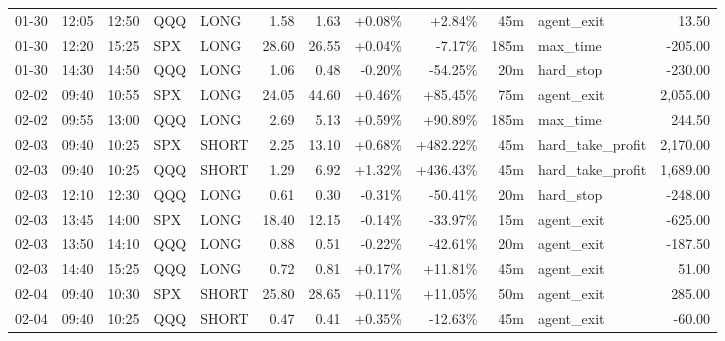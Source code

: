 \documentclass[11pt,a4paper,twoside]{article}
\begin{document}
\begin{center}
\begin{longtable}{>{\color{txtmain}}l l l l l r r r r r >{\color{txtmain}}l r}
01-30 & 12:05 & 12:50 & QQQ & LONG & 1.58 & 1.63 & \textcolor{wingreen}{+0.08\%} & \textcolor{wingreen}{+2.84\%} & 45m & agent\_exit & \textcolor{wingreen}{13.50} \\
01-30 & 12:20 & 15:25 & SPX & LONG & 28.60 & 26.55 & \textcolor{wingreen}{+0.04\%} & \textcolor{lossred}{-7.17\%} & 185m & max\_time & \textcolor{lossred}{-205.00} \\
01-30 & 14:30 & 14:50 & QQQ & LONG & 1.06 & 0.48 & \textcolor{lossred}{-0.20\%} & \textcolor{lossred}{-54.25\%} & 20m & hard\_stop & \textcolor{lossred}{-230.00} \\
02-02 & 09:40 & 10:55 & SPX & LONG & 24.05 & 44.60 & \textcolor{wingreen}{+0.46\%} & \textcolor{wingreen}{+85.45\%} & 75m & agent\_exit & \textcolor{wingreen}{2,055.00} \\
02-02 & 09:55 & 13:00 & QQQ & LONG & 2.69 & 5.13 & \textcolor{wingreen}{+0.59\%} & \textcolor{wingreen}{+90.89\%} & 185m & max\_time & \textcolor{wingreen}{244.50} \\
02-03 & 09:40 & 10:25 & SPX & SHORT & 2.25 & 13.10 & \textcolor{wingreen}{+0.68\%} & \textcolor{wingreen}{+482.22\%} & 45m & hard\_take\_profit & \textcolor{wingreen}{2,170.00} \\
02-03 & 09:40 & 10:25 & QQQ & SHORT & 1.29 & 6.92 & \textcolor{wingreen}{+1.32\%} & \textcolor{wingreen}{+436.43\%} & 45m & hard\_take\_profit & \textcolor{wingreen}{1,689.00} \\
02-03 & 12:10 & 12:30 & QQQ & LONG & 0.61 & 0.30 & \textcolor{lossred}{-0.31\%} & \textcolor{lossred}{-50.41\%} & 20m & hard\_stop & \textcolor{lossred}{-248.00} \\
02-03 & 13:45 & 14:00 & SPX & LONG & 18.40 & 12.15 & \textcolor{lossred}{-0.14\%} & \textcolor{lossred}{-33.97\%} & 15m & agent\_exit & \textcolor{lossred}{-625.00} \\
02-03 & 13:50 & 14:10 & QQQ & LONG & 0.88 & 0.51 & \textcolor{lossred}{-0.22\%} & \textcolor{lossred}{-42.61\%} & 20m & agent\_exit & \textcolor{lossred}{-187.50} \\
02-03 & 14:40 & 15:25 & QQQ & LONG & 0.72 & 0.81 & \textcolor{wingreen}{+0.17\%} & \textcolor{wingreen}{+11.81\%} & 45m & agent\_exit & \textcolor{wingreen}{51.00} \\
02-04 & 09:40 & 10:30 & SPX & SHORT & 25.80 & 28.65 & \textcolor{wingreen}{+0.11\%} & \textcolor{wingreen}{+11.05\%} & 50m & agent\_exit & \textcolor{wingreen}{285.00} \\
02-04 & 09:40 & 10:25 & QQQ & SHORT & 0.47 & 0.41 & \textcolor{wingreen}{+0.35\%} & \textcolor{lossred}{-12.63\%} & 45m & agent\_exit & \textcolor{lossred}{-60.00} \\

\end{longtable}
\end{center}
\end{document}
